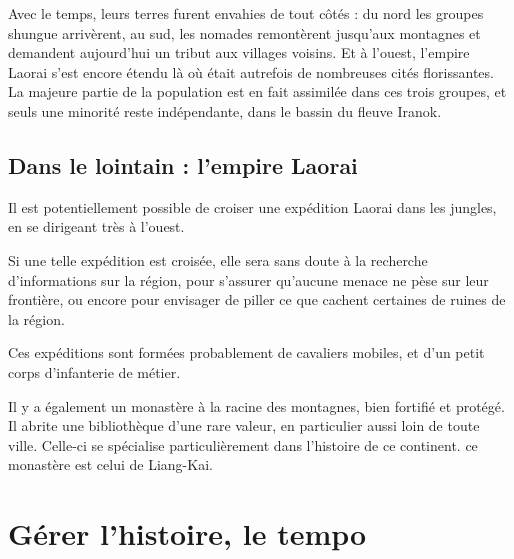 \documentclass[10pt,a4paper]{book}
\begin{document}
Avec le temps, leurs terres furent envahies de tout côtés : du nord les groupes shungue arrivèrent, au sud, les nomades remontèrent jusqu'aux montagnes et demandent aujourd'hui un tribut aux villages voisins. Et à l'ouest, l'empire Laorai s'est encore étendu là où était autrefois de nombreuses cités florissantes. La majeure partie de la population est en fait assimilée dans ces trois groupes, et seuls une minorité reste indépendante, dans le bassin du fleuve Iranok.
\section{Dans le lointain : l'empire Laorai}
Il est potentiellement possible de croiser une expédition Laorai dans les jungles, en se dirigeant très à l'ouest. 

Si une telle expédition est croisée, elle sera sans doute à la recherche d'informations sur la région, pour s'assurer qu'aucune menace ne pèse sur leur frontière, ou encore pour envisager de piller ce que cachent certaines de ruines de la région.

Ces expéditions sont formées probablement de cavaliers mobiles, et d'un petit corps d'infanterie de métier.

Il y a également un monastère à la racine des montagnes, bien fortifié et protégé. Il abrite une bibliothèque d'une rare valeur, en particulier aussi loin de toute ville. Celle-ci se spécialise particulièrement dans l'histoire de ce continent. ce monastère est celui de Liang-Kai.

\chapter{Gérer l'histoire, le tempo}
\end{document}

